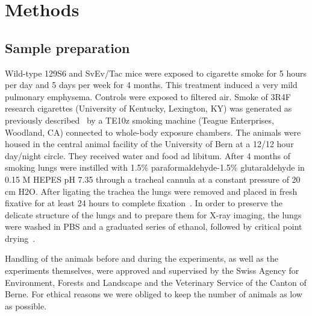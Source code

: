\section{Methods}\label{sec:methods}
\subsection{Sample preparation}
Wild-type 129S6 and SvEv/Tac mice \cite{Dai_2015} were exposed to cigarette smoke for 5 hours per day and 5 days per week for 4 months. This treatment induced a very mild pulmonary emphysema. Controls were exposed to filtered air. Smoke of 3R4F research cigarettes (University of Kentucky, Lexington, KY) was generated as previously described~\cite{Cremona_2013} by a TE10z smoking machine (Teague Enterprises, Woodland, CA) connected to whole-body exposure chambers. The animals were housed in the central animal facility of the University of Bern at a 12/12 hour day/night circle. They received water and food ad libitum. After 4 months of smoking lungs were instilled with 1.5\% paraformaldehyde-1.5\% glutaraldehyde in 0.15 M HEPES pH 7.35 through a tracheal cannula at a constant pressure of 20 cm H2O. After ligating the trachea the lungs were removed and placed in fresh fixative for at least 24 hours to complete fixation~\cite{Cremona_2013}. In order to preserve the delicate structure of the lungs and to prepare them for X-ray imaging, the lungs were washed in PBS and a graduated series of ethanol, followed by critical point drying~\cite{Barr__2016,Kaeslin_2005}.

Handling of the animals before and during the experiments, as well as the experiments themselves, were approved and supervised by the Swiss Agency for Environment, Forests and Landscape and the Veterinary Service of the Canton of Berne. For ethical reasons we were obliged to keep the number of animals as low as possible.

